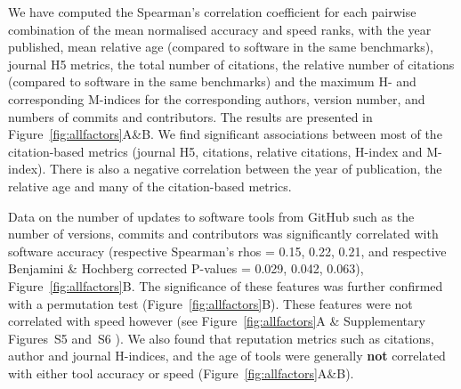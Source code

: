\documentclass{bmcart}
\begin{document}
We have computed the Spearman’s correlation coefficient for each
pairwise combination of the mean normalised accuracy and speed ranks,
with the year published, mean relative age (compared to software in the
same benchmarks), journal H5 metrics, the total number of citations,
the relative number of citations (compared to software in the same
benchmarks) and the maximum H- and corresponding M-indices for the corresponding
authors, version number, and numbers of commits and contributors.
The results are presented in Figure~\ref{fig:allfactors}A\&B. We find
significant associations between most of the citation-based metrics
(journal H5, citations, relative citations, H-index and
M-index). There is also a negative correlation between the year of
publication, the relative age and many of the citation-based metrics.

Data on the number of updates to software tools from GitHub such as
the number of versions, commits and contributors was significantly
correlated with software accuracy (respective Spearman’s rhos =
{\color{black}0.15, 0.22, 0.21,} and respective Benjamini \& Hochberg
corrected P-values = {\color{black}0.029, 0.042, 0.063}),
Figure~\ref{fig:allfactors}B.  The significance of these features was
further confirmed with a permutation test
(Figure~\ref{fig:allfactors}B).  These features were not correlated
with speed however (see Figure~\ref{fig:allfactors}A {\color{red}\& Supplementary
Figures~S5 and~S6}%
).  We also found that
reputation metrics such as citations, author and journal H-indices,
and the age of tools were generally \textbf{not} correlated with
either tool accuracy or speed (Figure~\ref{fig:allfactors}A\&B).


\end{document}
